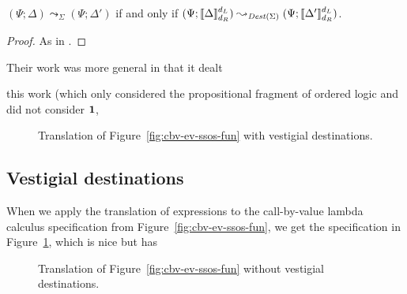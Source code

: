 

\bigskip
\begin{theorem}~\\\label{thm:destcorrect}
$(\Psi; \Delta) \leadsto_\Sigma (\Psi; \Delta')$ if and only if
$(\Psi; \llbracket \Delta \rrbracket^{d_L}_{d_R}) \leadsto_{{\it Dest}(\Sigma)}
 (\Psi; \llbracket \Delta' \rrbracket^{d_L}_{d_R})$.
\end{theorem}

\begin{proof}
As in \cite[Appendix A]{simmons11logical}.
\end{proof}

Their work was more general
in that it dealt 

 this work (which only
considered the propositional fragment of ordered logic and did not
consider $\mathbf{1}$, 


\begin{figure}
\caption{Translation of Figure~\ref{fig:cbv-ev-ssos-fun} with vestigial destinations.}
\label{fig:dest-vestige}
\end{figure}

\subsection{Vestigial destinations}

When we apply the translation of expressions to the call-by-value 
lambda calculus specification from Figure~\ref{fig:cbv-ev-ssos-fun}, we get
the specification in Figure~\ref{fig:dest-vestige}, which is nice but
has 

\begin{figure}
\caption{Translation of Figure~\ref{fig:cbv-ev-ssos-fun} without vestigial destinations.}
\label{fig:dest-cbv}
\end{figure}


